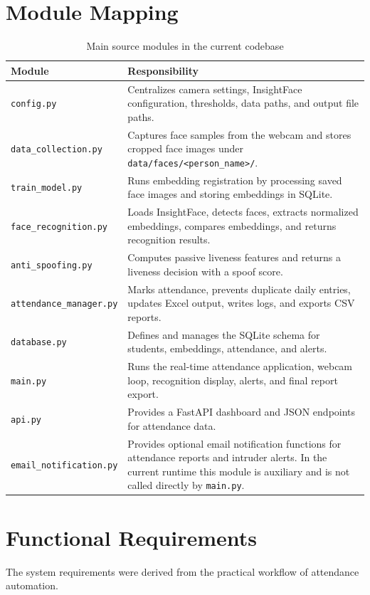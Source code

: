 \documentclass[12pt,a4paper]{report}
\newcommand{\JustifiedNormal}{\fontsize{12}{14}\selectfont\justifying\setlength{\parindent}{0pt}}
\begin{document}
\section{Module Mapping}
\JustifiedNormal
\begin{longtable}{|p{}|p{}|}
\caption{Main source modules in the current codebase}\\
\hline
\textbf{Module} & \textbf{Responsibility}\\
\hline
\texttt{config.py} & Centralizes camera settings, InsightFace configuration, thresholds, data paths, and output file paths.\\
\hline
\texttt{data\_collection.py} & Captures face samples from the webcam and stores cropped face images under \texttt{data/faces/<person\_name>/}.\\
\hline
\texttt{train\_model.py} & Runs embedding registration by processing saved face images and storing embeddings in SQLite.\\
\hline
\texttt{face\_recognition.py} & Loads InsightFace, detects faces, extracts normalized embeddings, compares embeddings, and returns recognition results.\\
\hline
\texttt{anti\_spoofing.py} & Computes passive liveness features and returns a liveness decision with a spoof score.\\
\hline
\texttt{attendance\_manager.py} & Marks attendance, prevents duplicate daily entries, updates Excel output, writes logs, and exports CSV reports.\\
\hline
\texttt{database.py} & Defines and manages the SQLite schema for students, embeddings, attendance, and alerts.\\
\hline
\texttt{main.py} & Runs the real-time attendance application, webcam loop, recognition display, alerts, and final report export.\\
\hline
\texttt{api.py} & Provides a FastAPI dashboard and JSON endpoints for attendance data.\\
\hline
\texttt{email\_notification.py} & Provides optional email notification functions for attendance reports and intruder alerts. In the current runtime this module is auxiliary and is not called directly by \texttt{main.py}.\\
\hline
\end{longtable}

\section{Functional Requirements}
\JustifiedNormal
The system requirements were derived from the practical workflow of attendance automation.
\end{document}
